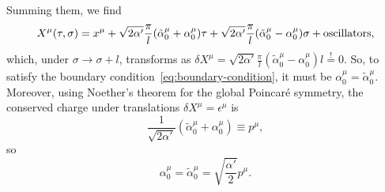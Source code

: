 Summing them, we find
\begin{equation}\label{eq:generic-expansion}
    X^\mu (\tau,\sigma) = x^\mu + \sqrt{2\alpha'} \frac{\pi}{l} (\tilde{\alpha}^\mu_0 + \alpha^\mu_0) \tau + \sqrt{2\alpha'} \frac{\pi}{l} (\tilde{\alpha}^\mu_0 - \alpha^\mu_0) \sigma + \textup{oscillators},
\end{equation}
which, under $\sigma \to \sigma + l$, transforms as $\delta X^\mu = \sqrt{2\alpha'}\frac{\pi}{l}(\tilde{\alpha}^\mu_0 - \alpha^\mu_0) l \overset{\mathrm{!}}{=} 0$. So, to satisfy the boundary condition~\eqref{eq:boundary-condition}, it must be $\alpha^\mu_0 = \tilde{\alpha}^\mu_0$. Moreover, using Noether's theorem for the global Poincaré symmetry, the conserved charge under translations $\delta X^\mu = \epsilon^\mu$ is 
\begin{equation}\label{eq:noteher-momentum}
    \frac{1}{\sqrt{2\alpha'}} (\tilde{\alpha}^\mu_0 + \alpha^\mu_0) \equiv p^\mu,
\end{equation}
so
\begin{equation}\label{eq:relation-alpha-momentum}
    \alpha^\mu_0 = \tilde{\alpha}^\mu_0 = \sqrt{\frac{\alpha'}{2}}p^\mu .
\end{equation}


